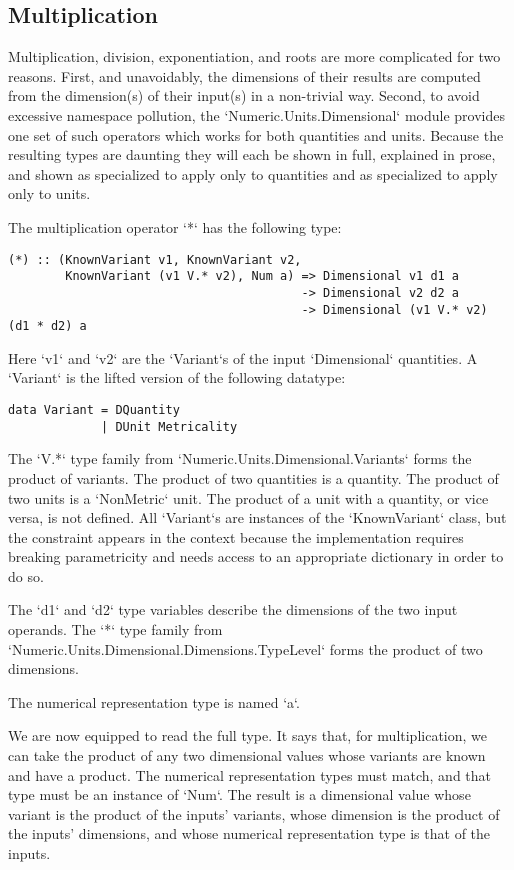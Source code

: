 \documentclass[11pt]{report}
\begin{document}
\subsection{Multiplication}

Multiplication, division, exponentiation, and roots are more complicated for two reasons. First, and unavoidably, the dimensions of their results are computed
from the dimension(s) of their input(s) in a non-trivial way. Second, to avoid excessive namespace pollution, the `Numeric.Units.Dimensional` module provides
one set of such operators which works for both quantities and units. Because the resulting types are daunting they will each be shown in full, explained in prose,
and shown as specialized to apply only to quantities and as specialized to apply only to units.

The multiplication operator `*` has the following type:

\begin{lstlisting}
(*) :: (KnownVariant v1, KnownVariant v2,
        KnownVariant (v1 V.* v2), Num a) => Dimensional v1 d1 a
                                         -> Dimensional v2 d2 a
                                         -> Dimensional (v1 V.* v2) (d1 * d2) a
\end{lstlisting}

Here `v1` and `v2` are the `Variant`s of the input `Dimensional` quantities. A `Variant` is the lifted version of the
following datatype:

\begin{lstlisting}
data Variant = DQuantity
             | DUnit Metricality
\end{lstlisting}

The `V.*` type family from `Numeric.Units.Dimensional.Variants` forms the product of variants. The product of two quantities is a quantity.
The product of two units is a `NonMetric` unit. The product of a unit with a quantity, or vice versa, is not defined. All `Variant`s are
instances of the `KnownVariant` class, but the constraint appears in the context because the implementation requires breaking parametricity and
needs access to an appropriate dictionary in order to do so.

The `d1` and `d2` type variables describe the dimensions of the two input operands. The `*` type family from `Numeric.Units.Dimensional.Dimensions.TypeLevel`
forms the product of two dimensions.

The numerical representation type is named `a`.

We are now equipped to read the full type. It says that, for multiplication, we can take the product of any two dimensional values whose
variants are known and have a product. The numerical representation types must match, and that type must be an instance of `Num`. The result is a dimensional value
whose variant is the product of the inputs' variants, whose dimension is the product of the inputs' dimensions, and whose numerical representation
type is that of the inputs.
\end{document}
